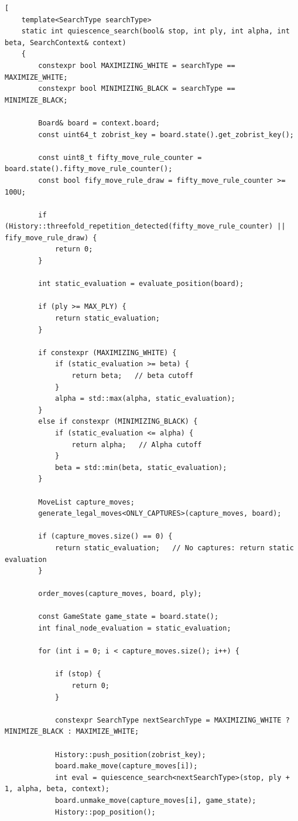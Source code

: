 \begin{lstlisting}[breaklines=true, frame=single]
[
    template<SearchType searchType>
    static int quiescence_search(bool& stop, int ply, int alpha, int beta, SearchContext& context)
    {
        constexpr bool MAXIMIZING_WHITE = searchType == MAXIMIZE_WHITE;
        constexpr bool MINIMIZING_BLACK = searchType == MINIMIZE_BLACK;
    
        Board& board = context.board;
        const uint64_t zobrist_key = board.state().get_zobrist_key();
    
        const uint8_t fifty_move_rule_counter = board.state().fifty_move_rule_counter();
        const bool fify_move_rule_draw = fifty_move_rule_counter >= 100U;
    
        if (History::threefold_repetition_detected(fifty_move_rule_counter) || fify_move_rule_draw) {
            return 0;
        }
    
        int static_evaluation = evaluate_position(board);
    
        if (ply >= MAX_PLY) {
            return static_evaluation;
        }
    
        if constexpr (MAXIMIZING_WHITE) {
            if (static_evaluation >= beta) {
                return beta;   // beta cutoff
            }
            alpha = std::max(alpha, static_evaluation);
        }
        else if constexpr (MINIMIZING_BLACK) {
            if (static_evaluation <= alpha) {
                return alpha;   // Alpha cutoff
            }
            beta = std::min(beta, static_evaluation);
        }
    
        MoveList capture_moves;
        generate_legal_moves<ONLY_CAPTURES>(capture_moves, board);
    
        if (capture_moves.size() == 0) {
            return static_evaluation;   // No captures: return static evaluation
        }
    
        order_moves(capture_moves, board, ply);
    
        const GameState game_state = board.state();
        int final_node_evaluation = static_evaluation;
    
        for (int i = 0; i < capture_moves.size(); i++) {
    
            if (stop) {
                return 0;
            }
    
            constexpr SearchType nextSearchType = MAXIMIZING_WHITE ? MINIMIZE_BLACK : MAXIMIZE_WHITE;
    
            History::push_position(zobrist_key);
            board.make_move(capture_moves[i]);
            int eval = quiescence_search<nextSearchType>(stop, ply + 1, alpha, beta, context);
            board.unmake_move(capture_moves[i], game_state);
            History::pop_position();
    

\end{lstlisting}
